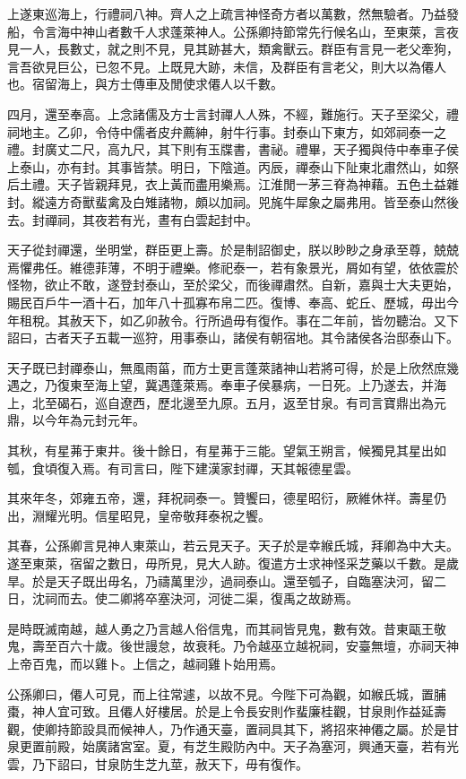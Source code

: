上遂東巡海上，行禮祠八神。齊人之上疏言神怪奇方者以萬數，然無驗者。乃益發船，令言海中神山者數千人求蓬萊神人。公孫卿持節常先行候名山，至東萊，言夜見一人，長數丈，就之則不見，見其跡甚大，類禽獸云。群臣有言見一老父牽狗，言吾欲見巨公，已忽不見。上既見大跡，未信，及群臣有言老父，則大以為僊人也。宿留海上，與方士傳車及閒使求僊人以千數。

四月，還至奉高。上念諸儒及方士言封禪人人殊，不經，難施行。天子至梁父，禮祠地主。乙卯，令侍中儒者皮弁薦紳，射牛行事。封泰山下東方，如郊祠泰一之禮。封廣丈二尺，高九尺，其下則有玉牒書，書祕。禮畢，天子獨與侍中奉車子侯上泰山，亦有封。其事皆禁。明日，下陰道。丙辰，禪泰山下阯東北肅然山，如祭后土禮。天子皆親拜見，衣上黃而盡用樂焉。江淮閒一茅三脊為神藉。五色土益雜封。縱遠方奇獸蜚禽及白雉諸物，頗以加祠。兕旄牛犀象之屬弗用。皆至泰山然後去。封禪祠，其夜若有光，晝有白雲起封中。

天子從封禪還，坐明堂，群臣更上壽。於是制詔御史，朕以眇眇之身承至尊，兢兢焉懼弗任。維德菲薄，不明于禮樂。修祀泰一，若有象景光，屑如有望，依依震於怪物，欲止不敢，遂登封泰山，至於梁父，而後禪肅然。自新，嘉與士大夫更始，賜民百戶牛一酒十石，加年八十孤寡布帛二匹。復博、奉高、蛇丘、歷城，毋出今年租稅。其赦天下，如乙卯赦令。行所過毋有復作。事在二年前，皆勿聽治。又下詔曰，古者天子五載一巡狩，用事泰山，諸侯有朝宿地。其令諸侯各治邸泰山下。

天子既已封禪泰山，無風雨菑，而方士更言蓬萊諸神山若將可得，於是上欣然庶幾遇之，乃復東至海上望，冀遇蓬萊焉。奉車子侯暴病，一日死。上乃遂去，并海上，北至碣石，巡自遼西，歷北邊至九原。五月，返至甘泉。有司言寶鼎出為元鼎，以今年為元封元年。

其秋，有星茀于東井。後十餘日，有星茀于三能。望氣王朔言，候獨見其星出如瓠，食頃復入焉。有司言曰，陛下建漢家封禪，天其報德星雲。

其來年冬，郊雍五帝，還，拜祝祠泰一。贊饗曰，德星昭衍，厥維休祥。壽星仍出，淵耀光明。信星昭見，皇帝敬拜泰祝之饗。

其春，公孫卿言見神人東萊山，若云見天子。天子於是幸緱氏城，拜卿為中大夫。遂至東萊，宿留之數日，毋所見，見大人跡。復遣方士求神怪采芝藥以千數。是歲旱。於是天子既出毋名，乃禱萬里沙，過祠泰山。還至瓠子，自臨塞決河，留二日，沈祠而去。使二卿將卒塞決河，河徙二渠，復禹之故跡焉。

是時既滅南越，越人勇之乃言越人俗信鬼，而其祠皆見鬼，數有效。昔東甌王敬鬼，壽至百六十歲。後世謾怠，故衰秏。乃令越巫立越祝祠，安臺無壇，亦祠天神上帝百鬼，而以雞卜。上信之，越祠雞卜始用焉。

公孫卿曰，僊人可見，而上往常遽，以故不見。今陛下可為觀，如緱氏城，置脯棗，神人宜可致。且僊人好樓居。於是上令長安則作蜚廉桂觀，甘泉則作益延壽觀，使卿持節設具而候神人，乃作通天臺，置祠具其下，將招來神僊之屬。於是甘泉更置前殿，始廣諸宮室。夏，有芝生殿防內中。天子為塞河，興通天臺，若有光雲，乃下詔曰，甘泉防生芝九莖，赦天下，毋有復作。

